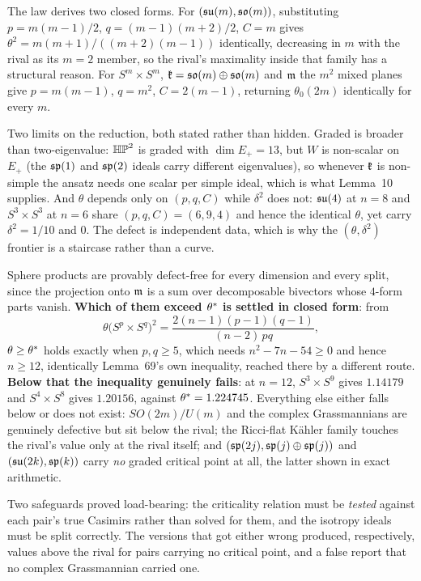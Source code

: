 The law derives two closed forms. For $(\mathfrak{su}(m),\mathfrak{so}(m))$, substituting $p=m(m-1)/2$, $q=(m-1)(m+2)/2$, $C=m$ gives $\theta^2=m(m+1)/((m+2)(m-1))$ identically, decreasing in $m$ with the rival as its $m=2$ member, so the rival's maximality inside that family has a structural reason. For $S^m\times S^m$, $\mathfrak{k}=\mathfrak{so}(m)\oplus\mathfrak{so}(m)$ and $\mathfrak{m}$ the $m^2$ mixed planes give $p=m(m-1)$, $q=m^2$, $C=2(m-1)$, returning $\theta_0(2m)$ identically for every $m$.

\begin{remarkstar}
Two limits on the reduction, both stated rather than hidden. Graded is broader than two-eigenvalue: $\mathbb{HP}^2$ is graded with $\dim E_+=13$, but $W$ is non-scalar on $E_+$ (the $\mathfrak{sp}(1)$ and $\mathfrak{sp}(2)$ ideals carry different eigenvalues), so whenever $\mathfrak{k}$ is non-simple the ansatz needs one scalar per simple ideal, which is what Lemma~10 supplies. And $\theta$ depends only on $(p,q,C)$ while $\delta^2$ does not: $\mathfrak{su}(4)$ at $n=8$ and $S^3\times S^3$ at $n=6$ share $(p,q,C)=(6,9,4)$ and hence the identical $\theta$, yet carry $\delta^2=1/10$ and $0$. The defect is independent data, which is why the $(\theta,\delta^2)$ frontier is a staircase rather than a curve.
\end{remarkstar}

Sphere products are provably defect-free for every dimension and every split, since the projection onto $\mathfrak{m}$ is a sum over decomposable bivectors whose $4$-form parts vanish. \textbf{Which of them exceed $\theta^{*}$ is settled in closed form}: from
\[
\theta\big(S^p\times S^q\big)^2=\frac{2(n-1)(p-1)(q-1)}{(n-2)\,pq},
\]
$\theta\ge\theta^{*}$ holds exactly when $p,q\ge5$, which needs $n^2-7n-54\ge0$ and hence $n\ge12$, identically Lemma~69's own inequality, reached there by a different route. \textbf{Below that the inequality genuinely fails}: at $n=12$, $S^3\times S^9$ gives $1.14179$ and $S^4\times S^8$ gives $1.20156$, against $\theta^{*}=1.224745$. Everything else either falls below or does not exist: $SO(2m)/U(m)$ and the complex Grassmannians are genuinely defective but sit below the rival; the Ricci-flat K\"ahler family touches the rival's value only at the rival itself; and $(\mathfrak{sp}(2j),\mathfrak{sp}(j)\oplus\mathfrak{sp}(j))$ and $(\mathfrak{su}(2k),\mathfrak{sp}(k))$ carry \emph{no} graded critical point at all, the latter shown in exact arithmetic.

Two safeguards proved load-bearing: the criticality relation must be \emph{tested} against each pair's true Casimirs rather than solved for them, and the isotropy ideals must be split correctly. The versions that got either wrong produced, respectively, values above the rival for pairs carrying no critical point, and a false report that no complex Grassmannian carried one.

